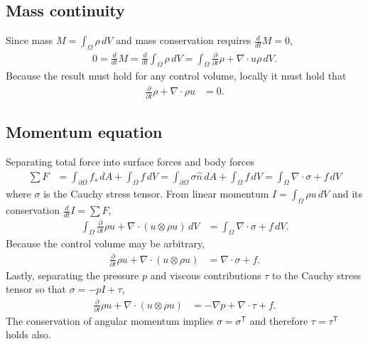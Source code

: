 \documentclass[letterpaper,11pt,nointlimits,reqno,draft]{amsbook}
\newcommand{\trans}[1]{{#1}^{\ensuremath{\mathsf{T}}}}
\begin{document}
\subsection{Mass continuity}
Since mass $M=\int_{\Omega} \rho\,dV$
and mass conservation requires $\frac{d}{dt}M=0$,
\begin{align}
  0 = \frac{d}{dt}M
  = \frac{d}{dt}\int_{\Omega} \rho\,dV
  =
  \int_{\Omega}\frac{\partial}{\partial{}t}\rho+\nabla\cdot{}u\rho{}\,dV.
\end{align}
Because the result must hold for any control volume, locally it must hold that
\begin{align}
  \label{eq:cons_mass}
  \frac{\partial}{\partial{}t}\rho+\nabla\cdot\rho{}u &= 0
  .
\end{align}

\subsection{Momentum equation}
Separating total force into surface forces and body forces
\begin{align}
  \sum{}F
  &=
     \int_{\partial\Omega} f_s \, dA
   + \int_{\Omega} f \, dV
  =
     \int_{\partial\Omega} \sigma \hat{n} \, dA
  +  \int_{\Omega} f \, dV
  =  \int_{\Omega} \nabla\cdot\sigma + f \, dV
\end{align}
where $\sigma$ is the Cauchy stress tensor.  From linear momentum
$I=\int_{\Omega} \rho{}u\,dV$ and its conservation $\frac{d}{dt}I=\sum{}F$,
\begin{align}
    \int_{\Omega}\frac{\partial{}}{\partial{}t}\rho{}u
  + \nabla\cdot(u\otimes{}\rho{}u)\,dV
&= \int_{\Omega} \nabla\cdot\sigma + f \, dV
.
\end{align}
Because the control volume may be arbitrary,
\begin{align}
  \frac{\partial{}}{\partial{}t}\rho{}u + \nabla\cdot(u\otimes{}\rho{}u)
&= \nabla\cdot\sigma + f
.
\end{align}
Lastly, separating the pressure $p$ and viscous contributions $\tau$ to
the Cauchy stress tensor so that $\sigma = -p I + \tau$,
\begin{align}
\label{eq:cons_momentum}
\frac{\partial{}}{\partial{}t}\rho{}u + \nabla\cdot(u\otimes{}\rho{}u)
&= -\nabla{}p + \nabla\cdot{}\tau + f
.
\end{align}
The conservation of angular momentum implies $\sigma=\trans{\sigma}$ and
therefore $\tau=\trans{\tau}$ holds also.
\end{document}
